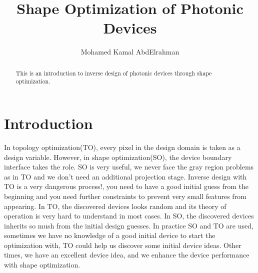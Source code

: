 \documentclass{tufte-handout}
\title{Shape Optimization of Photonic Devices }
\author[MK]{Mohamed Kamal AbdElrahman}
\begin{document}
\maketitle%

\begin{abstract}
This is an introduction to inverse design of  photonic devices through shape optimization.  
\end{abstract}
\section{Introduction}
In topology optimization(TO), every pixel in the design domain is taken as a design variable. However, in shape optimization(SO), the device boundary interface takes the role. SO is very useful, we never face the gray region problems as in TO and we don't need an additional projection stage.  Inverse design with TO is a very dangerous process!, you need to have a good initial guess from the beginning and you need further constraints to prevent very small features from appearing. In TO, the discovered devices looks random and its theory of operation is very hard to understand in most cases. In SO, the discovered devices inherits so mush from the initial design guesses. In practice SO and TO are used, sometimes we have no knowledge of a good initial device to start the optimization with, TO could help us discover some initial device ideas. Other times, we  have an excellent device idea, and we enhance the device performance with shape optimization. 
\end{document}
